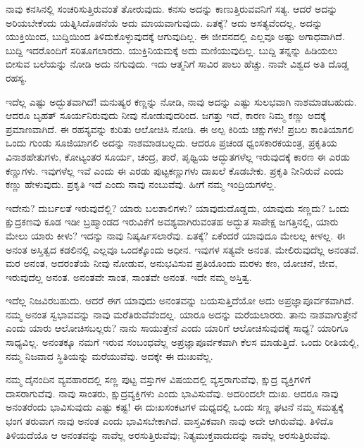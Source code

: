 ನಾವು ಕನಸಿನಲ್ಲಿ ಸಂಚರಿಸುತ್ತಿರುವಂತೆ ತೋರುವುದು. ಕನಸು ಅದನ್ನು ಕಾಣುತ್ತಿರುವವನಿಗೆ ಸತ್ಯ. ಆದರೆ ಅದನ್ನು ಅರಿಯಬೇಕೆಂದು ಯತ್ನಿಸಿದೊಡನೆಯೆ ಅದು ಮಾಯವಾಗುವುದು. ಏತಕ್ಕೆ? ಅದು ಅಸತ್ಯವೆಂದಲ್ಲ. ಅದನ್ನು ಯುಕ್ತಿಯಿಂದ, ಬುದ್ದಿಯಿಂದ ತಿಳಿದುಕೊಳ್ಳುವುದಕ್ಕೆ ಆಗುವುದಿಲ್ಲ. ಈ ಜೀವನದಲ್ಲಿ ಎಲ್ಲವೂ ಅಷ್ಟು ಅಗಾಧವಾಗಿದೆ. ಬುದ್ದಿ ಇದರೊಂದಿಗೆ ಸರಿತೂಗಲಾರದು. ಯುಕ್ತಿನಿಯಮಕ್ಕೆ ಅದು ಮಣಿಯುವುದಿಲ್ಲ. ಬುದ್ದಿ ತನ್ನನ್ನು ಹಿಡಿಯಲು ಬೀಸುವ ಬಲೆಯನ್ನು ನೋಡಿ ಅದು ನಗುವುದು. ಇದು ಆತ್ಮನಿಗೆ ಸಾವಿರ ಪಾಲು ಹೆಚ್ಚು. ನಾವೇ ವಿಶ್ವದ ಅತಿ ದೊಡ್ಡ ರಹಸ್ಯ.

\vskip -2pt

ಇದೆಲ್ಲ ಎಷ್ಟು ಅದ್ಭುತವಾಗಿದೆ! ಮನುಷ್ಯರ ಕಣ್ಣನ್ನು ನೋಡಿ, ನಾವು ಅದನ್ನು ಎಷ್ಟು ಸುಲಭವಾಗಿ ನಾಶಮಾಡಬಹುದು. ಆದರೂ ಬೃಹತ್ ಸೂರ್ಯನಿರುವುದು ನೀವು ನೋಡುವುದರಿಂದ. ಜಗತ್ತು ಇದೆ, ಕಾರಣ ನಿಮ್ಮ ಕಣ್ಣು ಅದಕ್ಕೆ ಪ್ರಮಾಣವಾಗಿದೆ. ಈ ರಹಸ್ಯವನ್ನು ಕುರಿತು ಆಲೋಚಿಸಿ ನೋಡಿ. ಈ ಅಲ್ಪ ಕಿರಿಯ ಚಕ್ಷುಗಳು! ಪ್ರಬಲ ಕಾಂತಿಯಾಗಲಿ ಒಂದು ಗುಂಡು ಸೂಜಿಯಾಗಲಿ ಅದನ್ನು ನಾಶಮಾಡಬಲ್ಲದು. ಆದರೂ ಪ್ರಚಂಡ ಧ್ವಂಸಕಾರಕಯಂತ್ರ, ಪ್ರಕೃತಿಯ ವಿನಾಶಹೇತುಗಳು, ಕೋಟ್ಯಂತರ ಸೂರ್ಯ, ಚಂದ್ರ, ತಾರೆ, ಪೃಥ್ವಿಯ ಅದ್ಭುತಗಳೆಲ್ಲ ಇರುವುದಕ್ಕೆ ಕಾರಣ ಈ ಎರಡು ಕಣ್ಣುಗಳು. ಇವುಗಳೆಲ್ಲ ಇವೆ ಎಂದು ಈ ಎರಡು ಪುಟ್ಟಕಣ್ಣುಗಳು ದಾಖಲೆ ಕೊಡಬೇಕು. ಪ್ರಕೃತಿ ನೀನಿರುವೆ ಎಂದು ಕಣ್ಣು ಹೇಳುವುದು. ಪ್ರಕೃತಿ ಇದೆ ಎಂದು ನಾವು ನಂಬುವೆವು. ಹೀಗೆ ನಮ್ಮ ಇಂದ್ರಿಯಗಳೆಲ್ಲ.

\vskip -2pt

ಇದೇನು? ದುರ್ಬಲತೆ ಇರುವುದೆಲ್ಲಿ? ಯಾರು ಬಲಶಾಲಿಗಳು? ಯಾವುದು\break ದೊಡ್ಡದು, ಯಾವುದು ಸಣ್ಣದು? ಒಂದು ಕ್ಷುದ್ರಕಣವು ಕೂಡ ಇಡೀ ಬ್ರಹ್ಮಾಂಡದ ಇರುವಿಕೆಗೆ ಅವಶ್ಯವಾಗಿರುವಂತಹ ಅದ್ಭುತ ಸಾಪೇಕ್ಷ ಜಗತ್ತಿನಲ್ಲಿ, ಯಾರು ಮೇಲು ಯಾರು ಕೀಳು? ಇದನ್ನು ನಾವು ನಿಷ್ಕರ್ಷಿಸಲಾರೆವು. ಏತಕ್ಕೆ? ಏಕೆಂದರೆ ಯಾವುದೂ ಮೇಲಲ್ಲ ಕೀಳಲ್ಲ. ಈ ಅನಂತ ಅಸ್ತಿತ್ವದ ಕಡಲಿನಲ್ಲಿ ಎಲ್ಲವೂ ಒಂದಕ್ಕೊಂದು ಅಧೀನ. ಇವುಗಳ ಸತ್ಯವೇ ಅನಂತ. ಮೇಲಿರುವುದೆಲ್ಲ ಅನಂತವೆ. ಮರ ಅನಂತ, ಅದರಂತೆಯೆ ನೀವು ನೋಡುವ, ಅನುಭವಿಸುವ ಪ್ರತಿಯೊಂದು ಮರಳು ಕಣ, ಯೋಚನೆ, ಜೀವ, ಇರುವುದೆಲ್ಲ ಅನಂತ. ಅನಂತವೇ ಸಾಂತ, ಸಾಂತವೇ ಅನಂತ. ಇದೇ ನಮ್ಮ ಅಸ್ತಿತ್ವ.

ಇದೆಲ್ಲ ನಿಜವಿರಬಹುದು. ಆದರೆ ಈಗ ಯಾವುದು ಅನಂತವನ್ನು ಬಯಸುತ್ತಿದೆಯೋ ಅದು ಅಪ್ರಜ್ಞಾಪೂರ್ವಕವಾಗಿದೆ. ನಮ್ಮ ಅನಂತ ಸ್ವಭಾವವನ್ನು ನಾವು ಮರೆತಿರುವೆವೆಂದಲ್ಲ. ಯಾರೂ ಅದನ್ನು ಮರೆಯಲಾರರು. ತಾನು ನಾಶವಾಗುತ್ತೇನೆ ಎಂದು ಯಾರು ಆಲೋಚಿಸಬಲ್ಲರು? ನಾನು ಸಾಯುತ್ತೇನೆ ಎಂದು ಯಾರಿಗೆ ಆಲೋಚಿಸುವುದಕ್ಕೆ ಸಾಧ್ಯ? ಯಾರಿಗೂ ಸಾಧ್ಯವಿಲ್ಲ. ಅನಂತಕ್ಕೂ ನಮಗೆ ಇರುವ ಸಂಬಂಧವೆಲ್ಲ ಅಪ್ರಜ್ಞಾಪೂರ್ವಕವಾಗಿ ಕೆಲಸ ಮಾಡುತ್ತಿದೆ. ಒಂದು ರೀತಿಯಲ್ಲಿ, ನಮ್ಮ ನಿಜವಾದ ಸ್ಥಿತಿಯನ್ನು ಮರೆಯುವೆವು. ಅದಕ್ಕೇ ಈ ದುಃಖವೆಲ್ಲ.

ನಮ್ಮ ದೈನಂದಿನ ವ್ಯವಹಾರದಲ್ಲಿ ಸಣ್ಣ ಪುಟ್ಟ ವಸ್ತುಗಳ ವಿಷಯದಲ್ಲಿ ವ್ಯಸ್ತರಾಗುವೆವು, ಕ್ಷುದ್ರ ವ್ಯಕ್ತಿಗಳಿಗೆ ದಾಸರಾಗುವೆವು. ನಾವು ಸಾಂತರು, ಕ್ಷುದ್ರವ್ಯಕ್ತಿಗಳು ಎಂದು ಭಾವಿಸುವೆವು. ಅದರಿಂದಲೇ ದುಃಖ. ಆದರೂ ನಾವು ಅನಂತರೆಂದು ಭಾವಿಸುವುದು ಎಷ್ಟು ಕಷ್ಟ! ಈ ದುಃಖಸಂಕಟಗಳ ಮಧ್ಯದಲ್ಲಿ ಒಂದು ಸಣ್ಣ ಘಟನೆ ನಮ್ಮ ಸಮತ್ವಕ್ಕೆ ಭಂಗ ತರುವಾಗ ನಾವು ಅನಂತ ಎಂದು ಭಾವಿಸಬೇಕಾಗಿದೆ. ವಾಸ್ತವಿಕವಾಗಿ ನಾವು ಅದೇ ಆಗಿರುವೆವು. ತಿಳಿದೊ ತಿಳಿಯದೆಯೊ ಆ ಅನಂತವನ್ನು ನಾವೆಲ್ಲ ಅರಸುತ್ತಿರುವೆವು; ನಿತ್ಯಮುಕ್ತವಾದುದನ್ನು ನಾವೆಲ್ಲ ಅರಸುತ್ತಿರುವೆವು.

